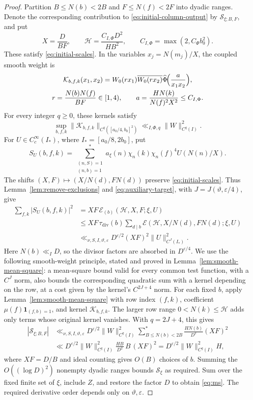 \documentclass[11pt,a4paper]{article}
\numberwithin{equation}{section}
\numberwithin{figure}{section}
\theoremstyle{definition}
\theoremstyle{remark}
\newcommand{\E}{\mathcal E}
\newcommand{\ind}{\mathbf1}
\begin{document}
\begin{proof}
Partition $B\le N(b)<2B$ and $F\le N(f)<2F$ into dyadic ranges.
Denote the corresponding contribution to
\eqref{eq:initial-column-output} by $\mathcal S_{\xi;B,F}$, and put
\[
 X=\frac D{BF},\qquad
 \mathcal H=\frac{C_{I,\Phi}D^2}{HB^2},\qquad
 C_{I,\Phi}=\max(2,C_\Phi b_0^2).
\]
These satisfy \eqref{eq:initial-scales}.
In the variables $x_j=N(m_j)/X$, the coupled smooth weight is
\[
 \begin{gathered}
 \mathcal K_{b,f,k}(x_1,x_2)
 =W_0(r x_1)\overline{W_0(r x_2)}
 \widehat\Phi\!\Bigl(\frac{a}{x_1x_2}\Bigr),\\
 r=\frac{N(b)N(f)}{BF}\in[1,4),\qquad
 a=\frac{HN(k)}{N(f)^2X^2}\le C_{I,\Phi}.
 \end{gathered}
\]
For every integer $q\ge0$, these kernels satisfy
\[
 \sup_{b,f,k}\|\mathcal K_{b,f,k}\|_{C^q([a_0/4,b_0]^2)}
 \ll_{I,\Phi,q}\|W\|_{C^q(I)}^2.
\]
For $U\in C_c^\infty(I_*)$, where $I_*=[a_0/8,2b_0]$, put
\[
 S_U(b,f,k)=\sum_{\substack{(n,S)=1\\(n,b)=1}}^*a_\xi(n)
       \chi_n(k)\chi_n(f)^4U(N(n)/X).
\]
The shifts $(X,F)\mapsto(X/N(d),FN(d))$ preserve
\eqref{eq:initial-scales}. Thus Lemma~\ref{lem:remove-exclusions}
and \eqref{eq:auxiliary-target}, with $J=J(\vartheta,\varepsilon/4)$, give
\[
 \begin{aligned}
 \sum_{f,k}|S_U(b,f,k)|^2
 &=XF\,\E_{(b)}(\mathcal H,X,F;\xi,U)\\
 &\le XF\,\tau_{\mathrm{div}}(b)
       \sum_{d\mid b}\E(\mathcal H,X/N(d),FN(d);\xi,U)\\
 &\ll_{\nu,S,I,\vartheta,\varepsilon}
 D^{\varepsilon/2}(XF)^2\|U\|_{C^J(I_*)}^2.
 \end{aligned}
\]
Here $N(b)\ll_I D$, so the divisor factors are absorbed in $D^{\varepsilon/4}$.
We use the following smooth-weight principle, stated and proved in
Lemma~\ref{lem:smooth-mean-square}: a mean-square bound valid for every
common test function, with a $C^J$ norm, also bounds the corresponding
quadratic sum with a kernel depending on the row, at a cost given by
the kernel's $C^{2J+4}$ norm.
For each fixed $b$, apply Lemma~\ref{lem:smooth-mean-square}
with row index $(f,k)$, coefficient $\mu(f)\ind_{(f,b)=1}$,
and kernel $\mathcal K_{b,f,k}$.
The larger row range $0<N(k)\le\mathcal H$ adds only terms
whose original kernel vanishes. With $q=2J+4$, this gives
\begin{equation}\label{eq:weighted}
 \begin{aligned}
 |\mathcal S_{\xi;B,F}|
 &\ll_{\nu,S,I,\vartheta,\varepsilon}
 D^{\varepsilon/2}\|W\|_{C^q(I)}^2
 \sum_{B\le N(b)<2B}^*\frac{HN(b)}{D^2}(XF)^2\\
 &\ll D^{\varepsilon/2}\|W\|_{C^q(I)}^2
 \frac{HB}{D^2}\,B\,(XF)^2
 =D^{\varepsilon/2}\|W\|_{C^q(I)}^2H,
 \end{aligned}
\end{equation}
where $XF=D/B$ and ideal counting gives $O(B)$ choices of $b$.
Summing the $O((\log D)^2)$ nonempty dyadic ranges bounds
$\mathcal S_\xi$ as required. Sum over the fixed finite set of $\xi$,
include $Z$, and restore the factor $D$ to obtain \eqref{eq:ms}.
The required derivative order depends only on $\vartheta,\varepsilon$.

\end{proof}
\end{document}
